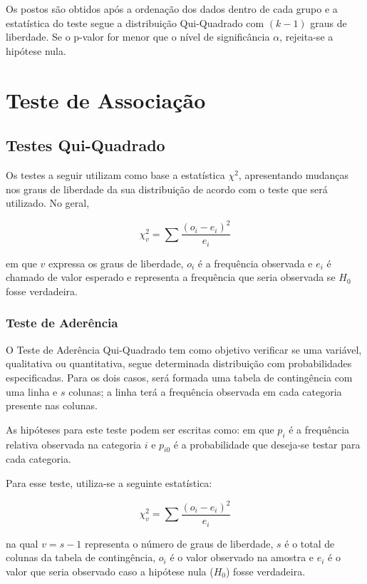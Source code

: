 \documentclass[
  portuguese,
]{estat/estat}
\let\oldsection\section
\renewcommand\section{\clearpage\oldsection}
\begin{document}
Os postos são obtidos após a ordenação dos dados dentro de cada grupo e
a estatística do teste segue a distribuição Qui-Quadrado com \((k-1)\)
graus de liberdade. Se o p-valor for menor que o nível de significância
\(\alpha\), rejeita-se a hipótese nula.

\section{Teste de Associação}\label{teste-de-associauxe7uxe3o}

\subsection{Testes Qui-Quadrado}\label{testes-qui-quadrado}

Os testes a seguir utilizam como base a estatística \(\chi^{2}\),
apresentando mudanças nos graus de liberdade da sua distribuição de
acordo com o teste que será utilizado. No geral,

\[ \chi_{v}^{2} = \sum \frac{(o_{i} - e_{i})^{2}}{e_{i}} \]

em que \(v\) expressa os graus de liberdade, \(o_{i}\) é a frequência
observada e \(e_{i}\) é chamado de valor esperado e representa a
frequência que seria observada se \(H_{0}\) fosse verdadeira.

\subsubsection{Teste de Aderência}\label{teste-de-aderuxeancia}

O Teste de Aderência Qui-Quadrado tem como objetivo verificar se uma
variável, qualitativa ou quantitativa, segue determinada distribuição
com probabilidades especificadas. Para os dois casos, será formada uma
tabela de contingência com uma linha e \(s\) colunas; a linha terá a
frequência observada em cada categoria presente nas colunas.

As hipóteses para este teste podem ser escritas como:
 em que \(p_{i}\) é a
frequência relativa observada na categoria \(i\) e \(p_{i0}\) é a
probabilidade que deseja-se testar para cada categoria.

Para esse teste, utiliza-se a seguinte estatística:

\[ \chi_{v}^{2} = \sum \frac{(o_{i} - e_{i})^{2}}{e_{i}} \]

na qual \(v = s - 1\) representa o número de graus de liberdade, \(s\) é
o total de colunas da tabela de contingência, \(o_{i}\) é o valor
observado na amostra e \(e_{i}\) é o valor que seria observado caso a
hipótese nula (\(H_0\)) fosse verdadeira.
\end{document}
